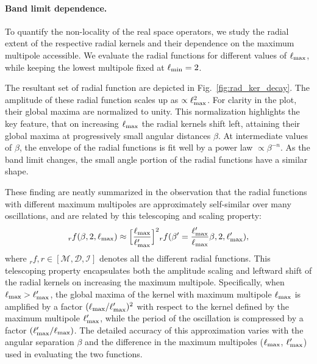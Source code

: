 \documentclass[a4paper,11pt]{article}
\newcommand{\mm}{\mathcal{M}}
\newcommand{\md}{\mathcal{D}}
\newcommand{\mi}{\mathcal{I}}
\def\fig#1{{Fig.~\ref{#1}}}
\begin{document}
\paragraph{Band limit dependence.} 
To quantify the non-locality of the real space operators, we study the radial extent of the respective radial kernels and their dependence on the maximum multipole accessible. We evaluate the radial functions for different values of $\ell_{\rm max}$, while keeping the lowest multipole fixed at $\ell_{\rm min}=2$. 

The resultant set of radial function are depicted in \fig{fig:rad_ker_decay}. The amplitude of these radial function scales up as $\propto \ell_{\rm max}^2$.  For clarity in the plot, their global maxima are normalized to unity.  This normalization highlights the key feature, that on increasing $\ell_{\rm max}$ the radial kernels shift left, attaining their global maxima at progressively small angular distances $\beta$.  At intermediate values of $\beta$, the envelope of the radial functions is fit well by a power law $ \propto \beta^{-n}$.  As the band limit changes, the small angle portion of the radial functions have a similar shape.

These finding are neatly summarized in the observation that the radial functions with different maximum multipoles are approximately self-similar over many oscillations, and are related by this telescoping and scaling property:
\begin{equation}{}_rf(\beta,2,\ell_{\rm max}) \approx \Big[\frac{\ell_{\rm max}}{\ell'_{\rm max}}\Big]^2{}_rf(\beta'=\frac{\ell'_{\rm max}}{\ell_{\rm max}} \beta ,2,\ell'_{\rm max}),\end{equation}
where ${}_rf , r \in [\mm, \md,\mi]$ denotes all the different radial functions. This telescoping property encapsulates both the amplitude scaling and leftward shift of the radial kernels on increasing the maximum multipole. {Specifically, when $\ell_{\rm max} > \ell'_{\rm max}$, the global maxima of the kernel with maximum multipole $\ell_{\rm max}$ is amplified by a factor $(\ell_{\rm max}/\ell'_{\rm max})^2$ with respect to the kernel defined by the maximum multipole $\ell'_{\rm max}$, while the period of the oscillation is compressed by a factor $(\ell'_{\rm max}/\ell_{\rm max})$. The detailed accuracy of this approximation varies with the angular separation $\beta$ and the difference in the maximum multipoles ($\ell_{\rm max}$, $\ell'_{\rm max}$)  used in evaluating the two functions.}
\end{document}
